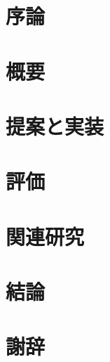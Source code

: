 % 


\frontmatter

\maketitle

\tableofcontents

\mainmatter

\chapter{序論}



\chapter{概要}



\chapter{提案と実装}



\chapter{評価}



\chapter{関連研究}



\chapter{結論}



\backmatter

\chapter{謝辞}



